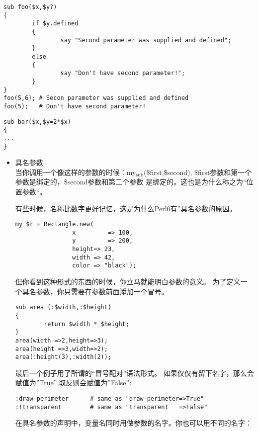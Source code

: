 \documentclass{ctexart}
\begin{document}
\begin{lstlisting}
sub foo($x,$y?)
{
        if $y.defined
        {
                say "Second parameter was supplied and defined";
        }
        else
        {
                say "Don't have second parameter!";
        }
}
foo(5,6); # Secon parameter was supplied and defined
foo(5);   # Don't have second parameter!
\end{lstlisting}

\begin{lstlisting}
sub bar($x,$y=2*$x)
{
...
}
\end{lstlisting}
\begin{itemize}

\item 具名参数\\
\label{sec-4-5-2-1}%
当你调用一个像这样的参数的时候：my$_{\mathrm{sub}}$(\$first,\$second),
\$first参数和第一个参数是绑定的，\$second参数和第二个参数
是绑定的。这也是为什么称之为“位置参数“。

有些时候，名称比数字更好记忆，这是为什么Perl6有”具名参数的原因。

\begin{lstlisting}
my $r = Rectangle.new(
                x         => 100,
                y         => 200,
                height=> 23,
                width => 42,
                color => "black");
\end{lstlisting}
但你看到这种形式的东西的时候，你立马就能明白参数的意义。
为了定义一个具名参数，你只需要在参数前面添加一个冒号。

\begin{lstlisting}
sub area (:$width,:$height)
{
        return $width * $height;
}
area(width =>2,height=>3);
area(height =>3,width=>2);
area(:height(3),:width(2));
\end{lstlisting}
最后一个例子用了所谓的“冒号配对”语法形式。
如果仅仅有留下名字，那么会赋值为''True'',取反则会赋值为''False'':

\begin{lstlisting}
:draw-perimeter      # same as "draw-perimeter=>True"
:!transparent        # same as "transparent   =>False"
\end{lstlisting}
在具名参数的声明中，变量名同时用做参数的名字。你也可以用不同的名字：


\end{itemize}
\end{document}
